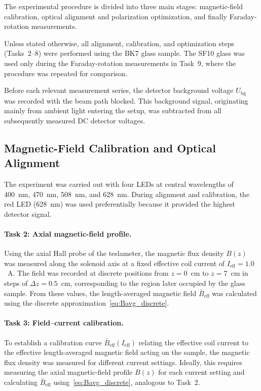 \documentclass[a4paper]{article}
\begin{document}
The experimental procedure is divided into three main stages: magnetic-field calibration, optical alignment and polarization optimization, and finally Faraday-rotation measurements.

Unless stated otherwise, all alignment, calibration, and optimization steps (Tasks~2--8) were performed using the BK7 glass sample.
The SF10 glass was used only during the Faraday-rotation measurements in Task~9, where the procedure was repeated for comparison.

Before each relevant measurement series, the detector background voltage $U_{\mathrm{bg}}$ was recorded with the beam path blocked.
This background signal, originating mainly from ambient light entering the setup, was subtracted from all subsequently measured DC detector voltages.

\subsection{Magnetic-Field Calibration and Optical Alignment}

The experiment was carried out with four LEDs at central wavelengths of 400~nm, 470~nm, 508~nm, and 628~nm.
During alignment and calibration, the red LED (628~nm) was used preferentially because it provided the highest detector signal.

\paragraph{\textbf{Task 2: Axial magnetic-field profile.}}
Using the axial Hall probe of the teslameter, the magnetic flux density $B(z)$ was measured along the solenoid axis at a fixed effective coil current of $I_{\mathrm{eff}} = 1.0$~A.
The field was recorded at discrete positions from $z = 0$~cm to $z = 7$~cm in steps of $\Delta z = 0.5$~cm, corresponding to the region later occupied by the glass sample.
From these values, the length-averaged magnetic field $\bar{B}_{\mathrm{eff}}$ was calculated using the discrete approximation~\eqref{eq:Bavg_discrete}.

\paragraph{\textbf{Task 3: Field--current calibration.}}
To establish a calibration curve $\bar{B}_{\mathrm{eff}}(I_{\mathrm{eff}})$ relating the effective coil current to the effective length-averaged magnetic field acting on the sample, the magnetic flux density was measured for different current settings.
Ideally, this requires measuring the axial magnetic-field profile $B(z)$ for each current setting and calculating $\bar{B}_{\mathrm{eff}}$ using~\eqref{eq:Bavg_discrete}, analogous to Task~2.
\end{document}
